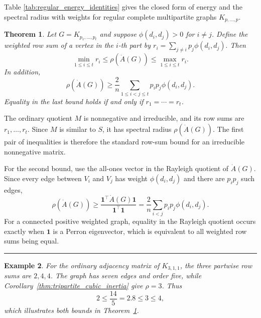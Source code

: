 \documentclass[12pt,twoside]{article}
\renewenvironment{proof}{{\noindent\bfseries Proof.}}{\qed}
\newtheorem{theorem}{Theorem}[section]
\newtheorem{example}[theorem]{Example}
\def\qed{\nolinebreak\hfill\rule{.2cm}{.2cm}\par\addvspace{.5cm}}
\begin{document}
Table \ref{tab:regular_energy_identities} gives the closed form of energy and the spectral radius with weights for regular complete multipartite graphs $K_{p,\ldots,p}.$

\begin{theorem}\label{thm:multipartite_rho_bounds}
	Let $G=K_{p_1,\ldots,p_t}$ and suppose $\phi(d_i,d_j)>0$ for $i\ne j$. Define the weighted row sum of a vertex in the $i$-th part by
	$
	r_i=\sum_{j\ne i}p_j\phi(d_i,d_j).
	$
	Then
	$$
	\min_{1\le i\le t}r_i\le \rho(\dot A(G))\le \max_{1\le i\le t}r_i.
	$$
	In addition,
	$$
	\rho(\dot A(G))\ge
	\frac{2}{n}\sum_{1\le i<j\le t}p_ip_j\phi(d_i,d_j).
	$$
	Equality in the last bound holds if and only if $r_1=\cdots=r_t$.
\end{theorem}

\begin{proof}
	The ordinary quotient $M$ is nonnegative and irreducible, and its row sums are $r_1,\ldots,r_t$. Since $M$ is similar to $S$, it has spectral radius $\rho(\dot A(G))$. The first pair of inequalities is therefore the standard row-sum bound for an irreducible nonnegative matrix.
	
	For the second bound, use the all-ones vector in the Rayleigh quotient of $\dot A(G)$. Since every edge between $V_i$ and $V_j$ has weight $\phi(d_i,d_j)$ and there are $p_ip_j$ such edges,
	$$
	\rho(\dot A(G))\ge
	\frac{\mathbf 1^{\top}\dot A(G)\mathbf 1}{\mathbf 1^{\top}\mathbf 1}
	=\frac{2}{n}\sum_{i<j}p_ip_j\phi(d_i,d_j).
	$$
	For a connected positive weighted graph, equality in the Rayleigh quotient occurs exactly when $\mathbf 1$ is a Perron eigenvector, which is equivalent to all weighted row sums being equal.
\end{proof}

\begin{example}\label{ex:rho_bounds_k311}
	For the ordinary adjacency matrix of $K_{3,1,1}$, the three partwise row sums are $2,4,4$. The graph has seven edges and order five, while Corollary~\ref{thm:tripartite_cubic_inertia} give $\rho=3$. Thus
	$$
	2\le \frac{14}{5}=2.8\le 3\le 4,
	$$
	which illustrates both bounds in Theorem~\ref{thm:multipartite_rho_bounds}.
\end{example}
\end{document}
